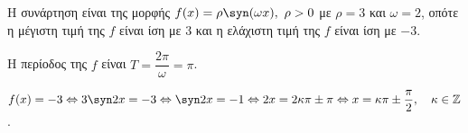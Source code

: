 \begin{alist}
\item 
\begin{rlist}
\item Η συνάρτηση είναι της μορφής $f(x) = \rho\syn (\omega x), \text{ } \rho > 0$ με $\rho = 3$ και $\omega = 2$, οπότε η μέγιστη τιμή της $f$ είναι ίση με $3$ και η ελάχιστη τιμή της $f$ είναι ίση με $-3$.
\item Η περίοδος της $f$ είναι $T = \dfrac{2\pi}{\omega} = \pi$.
\end{rlist}
\item $f(x) = -3 \Leftrightarrow 3\syn  2x = -3 \Leftrightarrow \syn  2x = -1 \Leftrightarrow 2x = 2\kappa\pi \pm \pi \Leftrightarrow x = \kappa\pi \pm \dfrac{\pi}{2}, \quad \kappa \in \mathbb{Z}$.
\end{alist}

